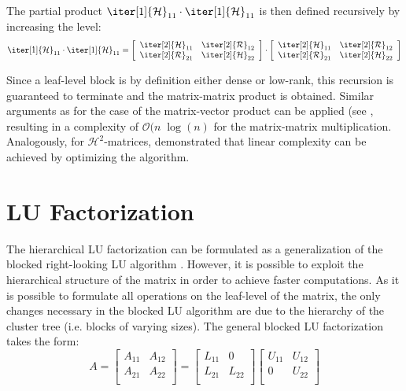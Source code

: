 \noindent The partial product $\iter[1]{\mathcal{H}}_{11} \cdot \iter[1]{\mathcal{H}}_{11}$ is then defined recursively by increasing the level:
\begin{equation}
    \iter[1]{\mathcal{H}}_{11} \cdot \iter[1]{\mathcal{H}}_{11}= 
      \left[
    \begin{array}{cc}
       \iter[2]{\mathcal{H}}_{11}& \iter[2]{\mathcal{R}}_{12} \\
      \iter[2]{\mathcal{R}}_{21} & \iter[2]{\mathcal{H}}_{22} \\
    \end{array}
  \right] \cdot 
  \left[
    \begin{array}{cc}
       \iter[2]{\mathcal{H}}_{11}& \iter[2]{\mathcal{R}}_{12} \\
      \iter[2]{\mathcal{R}}_{21} & \iter[2]{\mathcal{H}}_{22} \\
    \end{array}
  \right]
\end{equation}

\noindent Since a leaf-level block is by definition either dense or low-rank, this recursion is guaranteed to terminate and the matrix-matrix product is obtained. Similar arguments as for the case of the matrix-vector product can be applied (see \cite{hackbusch_hierarchical_2015}, resulting in a complexity of $\mathcal{O}(n \;\log(n)$ for the matrix-matrix multiplication.
Analogously, for $\mathcal{H}^2$-matrices, \cite{borm_h2-matrix_2006} demonstrated that linear complexity can be achieved by optimizing the algorithm.


\section{LU Factorization}
\label{sec:h_lu}
The hierarchical LU factorization can be formulated as a generalization of the blocked right-looking LU algorithm \cite{carratala-saez_exploiting_2019}. However, it is possible to exploit the hierarchical structure of the matrix in order to achieve faster computations. As it is possible to formulate all operations on the leaf-level of the matrix, the only changes necessary in the blocked LU algorithm are due to the hierarchy of the cluster tree (i.e. blocks of varying sizes). The general blocked LU factorization takes the form:
\begin{equation}
    A = 
  \left[
    \begin{array}{cc}
      A_{11}& A_{12} \\
      A_{21} & A_{22} \\
    \end{array}
  \right] = 
  \left[
    \begin{array}{cc}
      L_{11}& 0 \\
      L_{21} & L_{22} \\
    \end{array}
  \right]
  \left[
    \begin{array}{cc}
       U_{11}& U_{12} \\
       0 & U_{22} \\
    \end{array}
  \right]
\end{equation}

